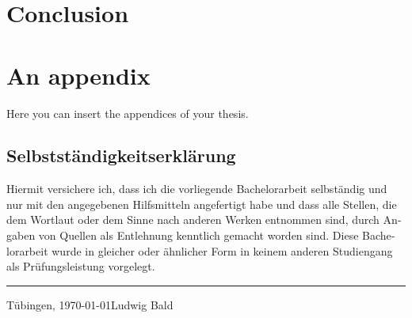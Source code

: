 \documentclass[twoside,12pt,a4paper]{report}
\begin{document}
\chapter{Conclusion}

\appendix %
\chapter{An appendix}
Here you can insert the appendices of your thesis.




\begin{otherlanguage}{ngerman}
	\chapter*{Selbstst\"andigkeitserkl\"arung}
	
	Hiermit versichere ich, dass ich die vorliegende Bachelorarbeit selbst\"andig und
	nur mit den angegebenen Hilfsmitteln angefertigt habe und dass alle Stellen,
	die dem Wortlaut oder dem Sinne nach anderen Werken entnommen sind,
	durch Angaben von Quellen als Entlehnung kenntlich gemacht worden sind.
	Diese Bachelorarbeit wurde in gleicher oder \"ahnlicher Form in keinem anderen
	Studiengang als Pr\"ufungsleistung vorgelegt.
	
	\vspace*{8ex}
	\hrule
	\vspace*{2ex}
	\noindent
	Tübingen, \today \hfill Ludwig Bald
\end{otherlanguage}
\end{document}
